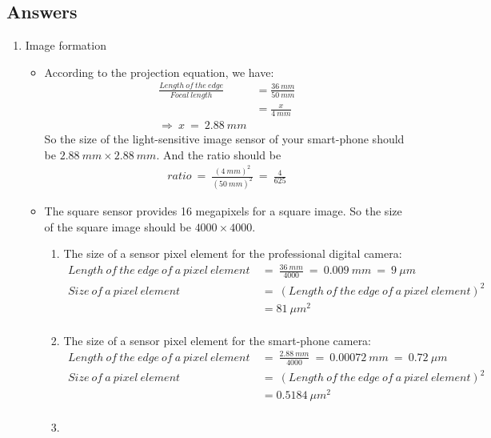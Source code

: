 \documentclass{article}
\begin{document}
\subsection{Answers}
\begin{enumerate}[label=A\arabic*)]
	\item Image formation 
		\begin{itemize}
			\item According to the projection equation, we have:
				\begin{align*}
					\frac{Length\:of\:the\:edge}{Focal\:length} &= \frac{36\:mm}{50\:mm} 
					\\ &= \frac{x}{4\:mm}
					\\ \Rightarrow\:x\:=\:2.88\:mm
				\end{align*}
				So the size of the light-sensitive image sensor of your smart-phone should be $2.88\:mm \times 2.88\:mm$. And the ratio should be
				\begin{align*}
					ratio\:=\:\frac{(4\:mm)^2}{(50\:mm)^2}\:=\:\frac{4}{625}
				\end{align*}
			 \item The square sensor provides 16 megapixels for a square image. So the size of the square image should be $4000 \times 4000$.
				\begin{enumerate}[label=(\roman*)]
					\item The size of a sensor pixel element for the professional digital camera:
						\begin{align*}
							Length\:of\:the\:edge\:of\:a\:pixel\:element\:&=\:\frac{36\:mm}{4000}\:=\:0.009\:mm\:=\:9\:\mu m \\
							Size\:of\:a\:pixel\:element\:&=\:(Length\:of\:the\:edge\:of\:a\:pixel\:element)^2 \\
							&=81\:\mu m^2 \\
						\end{align*}
					\item The size of a sensor pixel element for the smart-phone camera:
						\begin{align*}
							Length\:of\:the\:edge\:of\:a\:pixel\:element\:&=\:\frac{2.88\:mm}{4000}\:=\:0.00072\:mm\:=\:0.72\:\mu m \\
							Size\:of\:a\:pixel\:element\:&=\:(Length\:of\:the\:edge\:of\:a\:pixel\:element)^2 \\
							&=0.5184\:\mu m^2 \\
						\end{align*}
					\item 
						\begin{tabular}{ | r | c | c |}

\end{tabular}
\end{enumerate}
\end{itemize}
\end{enumerate}
\end{document}
